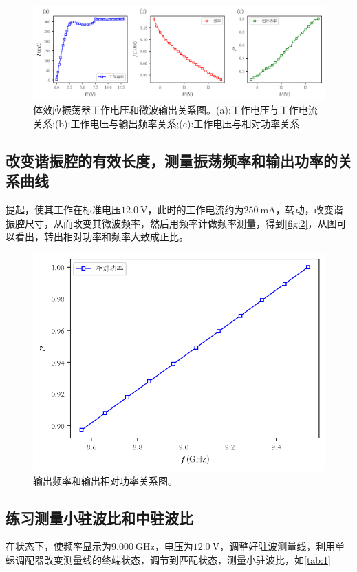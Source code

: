 \documentclass[font=fandol]{mpltx}
\begin{document}
\begin{figure}
	\centering
	\includegraphics[width=0.85\linewidth]{fig/1.png}
	\caption{体效应振荡器工作电压和微波输出关系图。(a):工作电压与工作电流关系;(b):工作电压与输出频率关系;(c):工作电压与相对功率关系}
	\label{fig:1}
\end{figure}



\subsection{改变谐振腔的有效长度，测量振荡频率和输出功率的关系曲线}
提起，使其工作在标准电压$\qty{12.0}{\V}$，此时的工作电流约为$\qty{250}{\mA}$，转动，改变谐振腔尺寸，从而改变其微波频率，然后用频率计做频率测量，得到\autoref{fig:2}，从图可以看出，转出相对功率和频率大致成正比。

\begin{figure}
	\centering
	\includegraphics[width=0.85\linewidth]{fig/2.png}
	\caption{输出频率和输出相对功率关系图。}
	\label{fig:2}
\end{figure}


\subsection{练习测量小驻波比和中驻波比}
在状态下，使频率显示为$\qty{9.000}{\GHz}$，电压为$\qty{12.0}{\V}$，调整好驻波测量线，利用单螺调配器改变测量线的终端状态，调节到匹配状态，测量小驻波比，如\autoref{tab:1}
\end{document}
